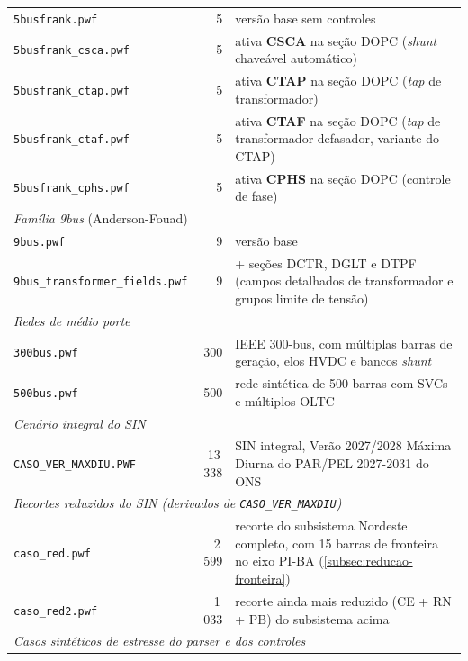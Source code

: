 \begin{table}[!htb]
{\begin{tabular}{p{4.4cm}rp{9.6cm}}
        \texttt{5busfrank.pwf}                     & 5 & versão base sem controles \\
        \texttt{5busfrank\_csca.pwf}               & 5 & ativa \textbf{CSCA} na seção DOPC (\textit{shunt} chaveável automático) \\
        \texttt{5busfrank\_ctap.pwf}               & 5 & ativa \textbf{CTAP} na seção DOPC (\textit{tap} de transformador) \\
        \texttt{5busfrank\_ctaf.pwf}               & 5 & ativa \textbf{CTAF} na seção DOPC (\textit{tap} de transformador defasador, variante do CTAP) \\
        \texttt{5busfrank\_cphs.pwf}               & 5 & ativa \textbf{CPHS} na seção DOPC (controle de fase) \\
        \midrule
        \multicolumn{3}{l}{\textit{Família 9bus} (Anderson-Fouad)} \\
        \midrule
        \texttt{9bus.pwf}                     & 9 & versão base \\
        \texttt{9bus\_transformer\_fields.pwf}& 9 & + seções DCTR, DGLT e DTPF (campos detalhados de transformador e grupos limite de tensão) \\
        \midrule
        \multicolumn{3}{l}{\textit{Redes de médio porte}} \\
        \midrule
        \texttt{300bus.pwf}              & 300    & IEEE 300-bus, com múltiplas barras de geração, elos HVDC e bancos \textit{shunt} \\
        \texttt{500bus.pwf}              & 500    & rede sintética de 500 barras com SVCs e múltiplos OLTC \\
        \midrule
        \multicolumn{3}{l}{\textit{Cenário integral do SIN}} \\
        \midrule
        \texttt{CASO\_VER\_MAXDIU.PWF}   & 13\,338 & SIN integral, Verão 2027/2028 Máxima Diurna do PAR/PEL 2027-2031 do ONS \\
        \midrule
        \multicolumn{3}{l}{\textit{Recortes reduzidos do SIN (derivados de \texttt{CASO\_VER\_MAXDIU})}} \\
        \midrule
        \texttt{caso\_red.pwf}           & 2\,599 & recorte do subsistema Nordeste completo, com 15 barras de fronteira no eixo PI-BA (\autoref{subsec:reducao-fronteira}) \\
        \texttt{caso\_red2.pwf}          & 1\,033 & recorte ainda mais reduzido (CE + RN + PB) do subsistema acima \\
        \midrule
        \multicolumn{3}{l}{\textit{Casos sintéticos de estresse do \textit{parser} e dos controles}} \\

\end{tabular}}
\end{table}
